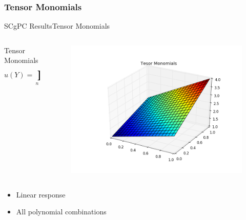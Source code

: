 \documentclass{beamer}
\begin{document}
\subsubsection{Tensor Monomials}
\begin{frame}{SCgPC Results}{Tensor Monomials}\vspace{-20pt}
  \begin{columns}
    \begin{column}{0.6\textwidth}
      \begin{block}{Tensor Monomials}
        \[u(Y) = \prod_{n=1}^N (y_n+1)\]
      \end{block}
    \end{column}
    \begin{column}{0.4\textwidth}
        \begin{figure}[h!]
          \centering
          \includegraphics[width=\linewidth]{anlmodels/tensor_monom}
        \end{figure}
    \end{column}
  \end{columns}
  \begin{itemize}
    \item Linear response
    \item All polynomial combinations
  \end{itemize}
\end{frame}
\end{document}
